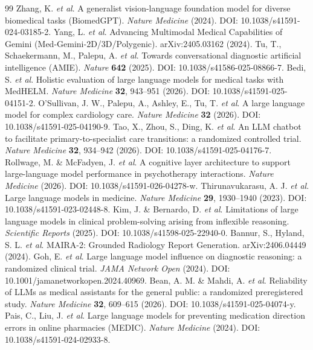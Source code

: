 \begin{thebibliography}{99}
 Zhang, K. \textit{et al}. A generalist vision-language foundation model for diverse biomedical tasks (BiomedGPT). \textit{Nature Medicine} (2024). DOI: 10.1038/s41591-024-03185-2.
 Yang, L. \textit{et al}. Advancing Multimodal Medical Capabilities of Gemini (Med-Gemini-2D/3D/Polygenic). arXiv:2405.03162 (2024).
 Tu, T., Schaekermann, M., Palepu, A. \textit{et al}. Towards conversational diagnostic artificial intelligence (AMIE). \textit{Nature} \textbf{642} (2025). DOI: 10.1038/s41586-025-08866-7.
 Bedi, S. \textit{et al}. Holistic evaluation of large language models for medical tasks with MedHELM. \textit{Nature Medicine} \textbf{32}, 943--951 (2026). DOI: 10.1038/s41591-025-04151-2.
 O'Sullivan, J. W., Palepu, A., Ashley, E., Tu, T. \textit{et al}. A large language model for complex cardiology care. \textit{Nature Medicine} \textbf{32} (2026). DOI: 10.1038/s41591-025-04190-9.
 Tao, X., Zhou, S., Ding, K. \textit{et al}. An LLM chatbot to facilitate primary-to-specialist care transitions: a randomized controlled trial. \textit{Nature Medicine} \textbf{32}, 934--942 (2026). DOI: 10.1038/s41591-025-04176-7.
 Rollwage, M. \& McFadyen, J. \textit{et al}. A cognitive layer architecture to support large-language model performance in psychotherapy interactions. \textit{Nature Medicine} (2026). DOI: 10.1038/s41591-026-04278-w.
 Thirunavukarasu, A. J. \textit{et al}. Large language models in medicine. \textit{Nature Medicine} \textbf{29}, 1930--1940 (2023). DOI: 10.1038/s41591-023-02448-8.
 Kim, J. \& Bernardo, D. \textit{et al}. Limitations of large language models in clinical problem-solving arising from inflexible reasoning. \textit{Scientific Reports} (2025). DOI: 10.1038/s41598-025-22940-0.
 Bannur, S., Hyland, S. L. \textit{et al}. MAIRA-2: Grounded Radiology Report Generation. arXiv:2406.04449 (2024).
 Goh, E. \textit{et al}. Large language model influence on diagnostic reasoning: a randomized clinical trial. \textit{JAMA Network Open} (2024). DOI: 10.1001/jamanetworkopen.2024.40969.
 Bean, A. M. \& Mahdi, A. \textit{et al}. Reliability of LLMs as medical assistants for the general public: a randomized preregistered study. \textit{Nature Medicine} \textbf{32}, 609--615 (2026). DOI: 10.1038/s41591-025-04074-y.
 Pais, C., Liu, J. \textit{et al}. Large language models for preventing medication direction errors in online pharmacies (MEDIC). \textit{Nature Medicine} (2024). DOI: 10.1038/s41591-024-02933-8.

\end{thebibliography}
